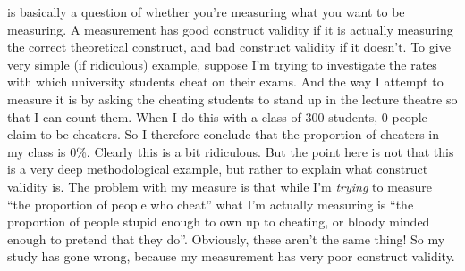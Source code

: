 
 is basically a question of whether you're measuring what you want to be measuring.  A measurement has good construct validity if it is actually measuring the correct theoretical construct, and bad construct validity if it doesn't.  To give very simple (if ridiculous) example, suppose I'm trying to investigate the rates with which university students cheat on their exams. And the way I attempt to measure it is by asking the cheating students to stand up in the lecture theatre so that I can count them. When I do this with a class of 300 students, 0 people claim to be cheaters. So I therefore conclude that the proportion of cheaters in my class is 0\%. Clearly this is a bit ridiculous. But the point here is not that this is a very deep methodological example, but rather to explain what construct validity is. The problem with my measure is that while I'm {\it trying} to measure ``the proportion of people who cheat'' what I'm actually measuring is ``the proportion of people stupid enough to own up to cheating, or bloody minded enough to pretend that they do''. Obviously, these aren't the same thing! So my study has gone wrong, because my measurement has very poor construct validity.




